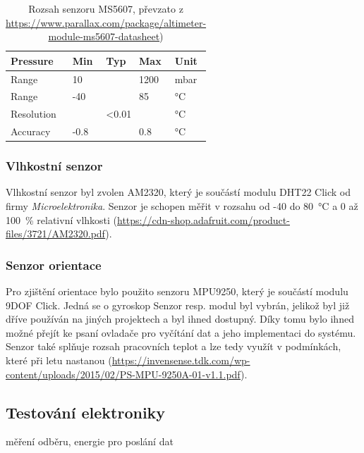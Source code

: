 \documentclass[twoside]{ctuthesis}
\theoremstyle{plain}
\theoremstyle{definition}
\theoremstyle{note}
\begin{document}
		\begin{table}[]
			\begin{tabular}{|l|lll|l|}
			\hline
			Pressure   & \multicolumn{1}{l|}{Min}  & \multicolumn{1}{l|}{Typ} & Max  & Unit \\ \hline
			Range      & \multicolumn{1}{l|}{10}   & \multicolumn{1}{l|}{}    & 1200 & mbar \\ \hline
			Range      & \multicolumn{1}{l|}{-40}  & \multicolumn{1}{l|}{}    & 85   & °C   \\ \hline
			Resolution & \multicolumn{3}{c|}{\textless{}0.01}                        & °C   \\ \hline
			Accuracy   & \multicolumn{1}{l|}{-0.8} & \multicolumn{1}{l|}{}    & 0.8  & °C   \\ \hline
			\end{tabular}
			\caption{Rozsah senzoru MS5607, převzato z \url{https://www.parallax.com/package/altimeter-module-ms5607-datasheet})}
			\label{tab:ms:range}
		\end{table}

		


		
		\subsubsection{Vlhkostní senzor}
		Vlhkostní senzor byl zvolen AM2320, který je součástí modulu DHT22 Click od firmy \textit{Microelektronika}. Senzor je schopen měřit v rozsahu od -40 do 80~°C a 0 až 100~\% relativní vlhkosti (\url{https://cdn-shop.adafruit.com/product-files/3721/AM2320.pdf}). 



		
		\subsubsection{Senzor orientace}
		Pro zjištění orientace bylo použito senzoru MPU9250, který je součástí modulu 9DOF Click. Jedná se o gyroskop Senzor resp. modul byl vybrán, jelikož byl již dříve používán na jiných projektech a byl ihned dostupný. Díky tomu bylo ihned možné přejít ke psaní ovladače pro vyčítání dat a jeho implementaci do systému. Senzor také splňuje rozsah pracovních teplot a lze tedy využít v podmínkách, které při letu nastanou (\url{https://invensense.tdk.com/wp-content/uploads/2015/02/PS-MPU-9250A-01-v1.1.pdf}).  
		


		
		\subsection{Testování elektroniky}
		měření odběru, energie pro poslání dat
\end{document}
